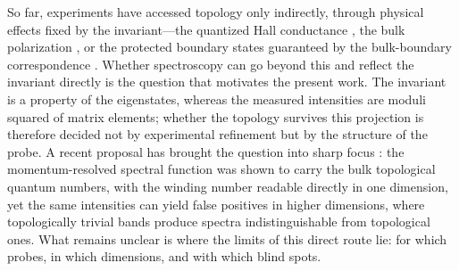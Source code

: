 \documentclass[onecolumn,aps,prl,superscriptaddress,longbibliography]{revtex4-2}
\begin{document}
So far, experiments have accessed topology only indirectly, through physical effects fixed by the invariant---the quantized Hall conductance \cite{thouless1982}, the bulk polarization \cite{kingsmith1993,thouless1983}, or the protected boundary states guaranteed by the bulk-boundary correspondence \cite{asboth2016}. Whether spectroscopy can go beyond this and reflect the invariant directly is the question that motivates the present work. The invariant is a property of the eigenstates, whereas the measured intensities are moduli squared of matrix elements; whether the topology survives this projection is therefore decided not by experimental refinement but by the structure of the probe. A recent proposal has brought the question into sharp focus \cite{estakeRoy2025}: the momentum-resolved spectral function was shown to carry the bulk topological quantum numbers, with the winding number readable directly in one dimension, yet the same intensities can yield false positives in higher dimensions, where topologically trivial bands produce spectra indistinguishable from topological ones. What remains unclear is where the limits of this direct route lie: for which probes, in which dimensions, and with which blind spots.
\end{document}
